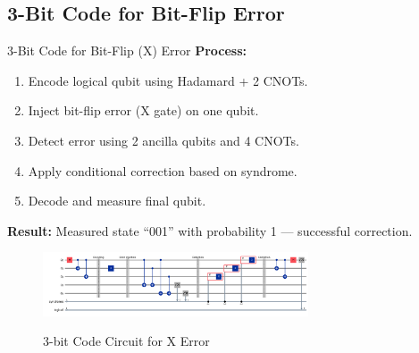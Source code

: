 \documentclass[10pt]{beamer}
\begin{document}
\subsection{3-Bit Code for Bit-Flip Error}
\begin{frame}{3-Bit Code for Bit-Flip (X) Error}
\textbf{Process:}
\begin{enumerate}
    \item Encode logical qubit using Hadamard + 2 CNOTs.
    \item Inject bit-flip error (X gate) on one qubit.
    \item Detect error using 2 ancilla qubits and 4 CNOTs.
    \item Apply conditional correction based on syndrome.
    \item Decode and measure final qubit.
\end{enumerate}

\vspace{0.3cm}
\textbf{Result:} Measured state “001” with probability 1 — successful correction.

\begin{figure}
  
  \centering
  \includegraphics[width=0.7\textwidth]{../../Codes/results/3bitCode/3bitCodeCircuit.png} \\[4pt]
  \caption{3-bit Code Circuit for X Error}
\end{figure}
\end{frame}
\end{document}
